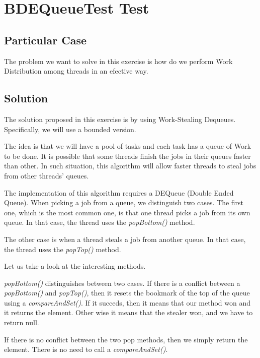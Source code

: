 \section{\textbf{BDEQueueTest Test}}
\subsection{Particular Case}
\par
The problem we want to solve in this exercise is how do we perform Work
Distribution among threads in an efective way.
\par
\subsection{Solution}
\par
The solution proposed in this exercise is by using Work-Stealing Dequeues.
Specifically, we will use a bounded version.
\par
The idea is that we will have a pool of tasks and each task has a queue of Work
to be done. It is possible that some threads finish the jobs in their queues
faster than other. In such situation, this algorithm will allow faster threads
to steal jobs from other threads' queues. 
\par
The implementation of this algorithm requires a DEQueue (Double Ended Queue).
When picking a job from a queue, we distinguish two cases. The first one, which
is the most common one, is that one thread picks a job from its own queue. In
that case, the thread uses the \textit{popBottom()} method.
\par
The other case is when a thread steals a job from another queue. In that case,
the thread uses the \textit{popTop()} method.
\par
Let us take a look at the interesting methods.
\par
\textit{popBottom()} distinguishes between two cases. If there is a conflict
between a \textit{popBottom()} and \textit{popTop()}, then it resets the
bookmark of the top of the queue using a \textit{compareAndSet()}. If it
succeds, then it means that our method won and it returns the element. Other
wise it means that the stealer won, and we have to return null.
\par
If there is no conflict between the two pop methods, then we simply return the
element. There is no need to call a \textit{compareAndSet()}.
